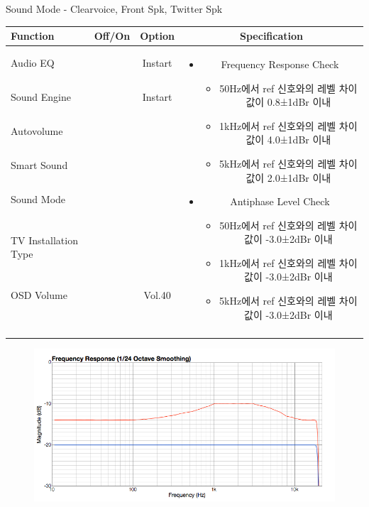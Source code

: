 \begin{frame}[t]{Sound Mode - Clearvoice, Front Spk, Twitter Spk}
\begin{tiny}
\begin{tabular}{@{}lccc@{}}
\toprule
Function & Off/On & Option & Specification \\
\midrule
Audio EQ & \color{black}{Off} & Instart &
\multirow{10}{60mm}{
\begin{itemize}
	\item Frequency Response Check
	\begin{itemize}
		\item 50Hz에서 ref 신호와의 레벨 차이값이 0.8±1dBr 이내
		\item 1kHz에서 ref 신호와의 레벨 차이값이 4.0±1dBr 이내
		\item 5kHz에서 ref 신호와의 레벨 차이값이 2.0±1dBr 이내	
	\end{itemize}
	\item Antiphase Level Check
	\begin{itemize}
		\item 50Hz에서 ref 신호와의 레벨 차이값이 -3.0±2dBr 이내
		\item 1kHz에서 ref 신호와의 레벨 차이값이 -3.0±2dBr 이내
		\item 5kHz에서 ref 신호와의 레벨 차이값이 -3.0±2dBr 이내
	\end{itemize}	
\end{itemize}
} \\
Sound Engine & \color{blue}{On} & Instart & \\
Autovolume & \color{black}{Off} & & \\
Smart Sound & \color{black}{Off} & & \\
Sound Mode & \color{blue}{On} & \color{blue}{Clearvoice} & \\
TV Installation Type & \color{blue}{On} & \color{black}{Standtype1} & \\
OSD Volume & \color{blue}{On} & Vol.40 & \\
& & & \\
& & & \\
& & & \\
& & & \\\midrule
\end{tabular}
\end{tiny}

\begin{figure}[b]
\includegraphics[height=0.4\textwidth]{figures/clearvoice.png}
\end{figure}

\end{frame}


